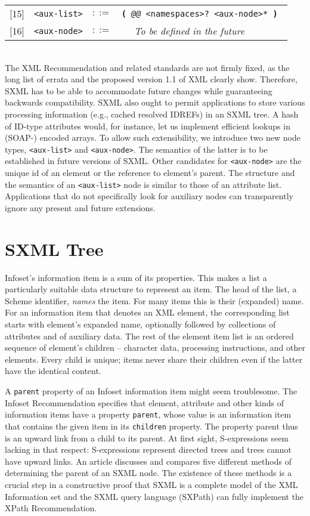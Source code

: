 \documentclass[10pt]{article}
\begin{document}
\begin{tabular}{rrcp{2.8in}}
{[}15{]} & \texttt{<aux-list>} &  $::=$ & \texttt{\textbf{(} {\itshape @@} <namespaces>? <aux-node>* \textbf{)} } \\
{[}16{]} & \texttt{<aux-node>} &  $::=$ & \texttt{~ } \emph{To be defined in the future}\\
\end{tabular}
\\
The XML Recommendation and related standards are not firmly
fixed, as the long list of errata and the proposed version 1.1 of XML
clearly show. Therefore, SXML has to be able to accommodate future
changes while guaranteeing backwards compatibility. SXML also ought to
permit applications to store various processing information (e.g.,
cached resolved IDREFs) in an SXML tree. A hash of ID-type attributes
would, for instance, let us implement efficient lookups in (SOAP-)
encoded arrays. To allow such extensibility, we introduce two new node
types, \texttt{<aux-list>} and \texttt{<aux-node>}. The semantics of
the latter is to be established in future versions of SXML. Other
candidates for \texttt{<aux-node>} are the unique id of an
element or the reference to element's parent. The structure and the
semantics of an \texttt{<aux-list>} node is similar to those of an attribute list. Applications that do not specifically look for auxiliary
nodes can transparently ignore any present and future extensions.

\section{SXML Tree}
Infoset's information item is a sum of its properties. This makes
a list a particularly suitable data structure to represent an
item. The head of the list, a Scheme identifier, \emph{names} the
item. For many items this is their (expanded) name. For an information
item that denotes an XML element, the corresponding list starts with
element's expanded name, optionally followed by collections of
attributes and of auxiliary data. The rest of the element item list
is an ordered sequence of element's children -- character data,
processing instructions, and other elements. Every child is unique;
items never share their children even if the latter have the identical
content.

A \texttt{parent} property of an Infoset information item
might seem troublesome. The Infoset Recommendation \cite{XML
Infoset} specifies that element, attribute and other kinds of
information items have a property \texttt{parent}, whose value is
an information item that contains the given item in its \texttt{children} property. The property parent thus is an upward link
from a child to its parent. At first sight, S-expressions seem lacking
in that respect: S-expressions represent directed trees and trees
cannot have upward links. An article \cite{Parent-pointers}
discusses and compares five different methods of determining the
parent of an SXML node. The existence of these methods is a crucial
step in a constructive proof that SXML is a complete model of the XML
Information set and the SXML query language (SXPath) can fully
implement the XPath Recommendation.
\end{document}
